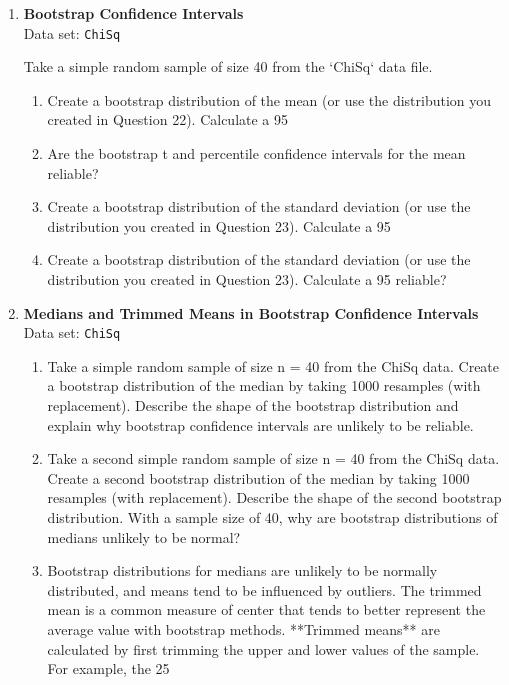 \documentclass[
]{report}
\begin{document}
\begin{enumerate}
  
  \item \textbf{Bootstrap Confidence Intervals} \\
  Data set: \texttt{ChiSq} 
  
  Take a simple random sample of size 40 from the `ChiSq` data file.
  \begin{enumerate}
      
  \item Create a bootstrap distribution of the mean (or use the distribution you created in Question 22). Calculate a 95%
    \item Are the bootstrap t and percentile confidence intervals for the mean reliable?
    \item Create a bootstrap distribution of the standard deviation (or use the distribution you created in Question 23). Calculate a 95%
    \item Create a bootstrap distribution of the standard deviation (or use the distribution you created in Question 23). Calculate a 95%
reliable?
  \end{enumerate}
  
  
  
  
  
  \item \textbf{Medians and Trimmed Means in Bootstrap Confidence Intervals} \\
  Data set: \texttt{ChiSq}
  \begin{enumerate}
      
  \item Take a simple random sample of size n = 40 from the ChiSq data. Create a bootstrap distribution of the median by taking 1000 resamples (with replacement). Describe the shape of the bootstrap distribution and explain why bootstrap confidence intervals are unlikely to be reliable.
    \item Take a second simple random sample of size n = 40 from the ChiSq data. Create a second bootstrap distribution of the median by taking 1000 resamples (with replacement). Describe the shape of the second bootstrap distribution. With a sample size of 40, why are bootstrap distributions of medians unlikely to be normal?
    \item Bootstrap distributions for medians are unlikely to be normally distributed, and means tend to be influenced by outliers. The trimmed mean is a common measure of center that tends to better represent the average value with bootstrap methods. **Trimmed means** are calculated by first trimming the upper and lower values of the sample. For example, the 25%


\end{enumerate}
\end{enumerate}
\end{document}
